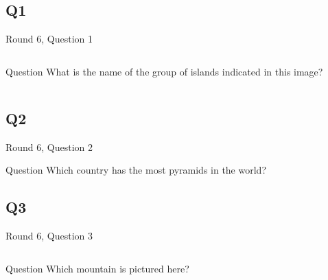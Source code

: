 \documentclass[11pt]{beamer}
\begin{document}
\subsection*{Q1}
\begin{frame}[t]{Round 6, Question 1}
\begin{columns}[T,totalwidth=\linewidth]
\begin{column}{0.32\linewidth}
\begin{block}{Question}
What is the name of the group of islands indicated in this image?
\end{block}
\end{column}
\begin{column}{0.65\linewidth}
\begin{center}
\texttt{[image: \{Images/galapagos]}.png}
\end{center}
\end{column}
\end{columns}
\end{frame}
\subsection*{Q2}
\begin{frame}[t]{Round 6, Question 2}
\begin{block}{Question}
Which country has the most pyramids in the world?
\end{block}
\end{frame}
\subsection*{Q3}
\begin{frame}[t]{Round 6, Question 3}
\begin{columns}[T,totalwidth=\linewidth]
\begin{column}{0.32\linewidth}
\begin{block}{Question}
Which mountain is pictured here?
\end{block}
\end{column}
\begin{column}{0.65\linewidth}
\begin{center}
\texttt{[image: \{Images/materhorn]}.jpg}
\end{center}
\end{column}
\end{columns}
\end{frame}
\end{document}
